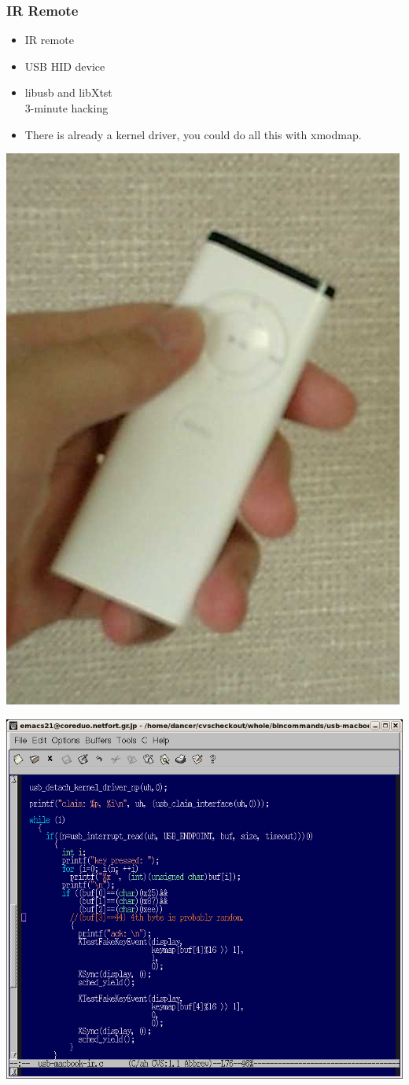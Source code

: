 \documentclass[cjk,dvipdfm]{beamer}
\begin{document}
\begin{frame}
 \frametitle{IR Remote}

\begin{minipage}[t]{0.4\hsize}
  \begin{itemize}
  \item<1-> IR remote\\
  \item<1-> USB HID device
  \item<2-> libusb and libXtst\\
       3-minute hacking
  \item<3-> There is already a kernel driver, you could do all this with
       xmodmap.
 \end{itemize}

      \includegraphics[width=0.4\hsize]{image200607/remote.png}

\end{minipage}
\begin{minipage}[t]{0.5\hsize}
 \includegraphics[width=2\hsize]{image200607/usbir.png}
\end{minipage}
\end{frame}
\end{document}
